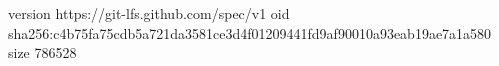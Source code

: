 version https://git-lfs.github.com/spec/v1
oid sha256:c4b75fa75cdb5a721da3581ce3d4f01209441fd9af90010a93eab19ae7a1a580
size 786528
